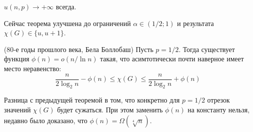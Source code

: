 \begin{exercise}
	$u(n, p) \to +\infty$ всегда.
\end{exercise}

\begin{note}
	Сейчас теорема улучшена до ограничений $\alpha \in (1 / 2; 1)$ и результата $\chi(G) \in \{u, u + 1\}$.
\end{note}

\begin{theorem} (80-е годы прошлого века, Бела Боллобаш)
	Пусть $p = 1 / 2$. Тогда существует функция $\phi(n) = o(n / \ln n)$ такая, что асимтотически почти наверное имеет место неравенство:
	\[
		\frac{n}{2\log_2 n} - \phi(n) \le \chi(G) \le \frac{n}{2\log_2 n} + \phi(n)
	\]
\end{theorem}

\begin{note}
	Разница с предыдущей теоремой в том, что конкретно для $p = 1 / 2$ отрезок значений $\chi(G)$ будет сужаться. При этом заменить $\phi(n)$ на константу нельзя, недавно было доказано, что $\phi(n) = \Omega(\sqrt[4]{n})$.
\end{note}